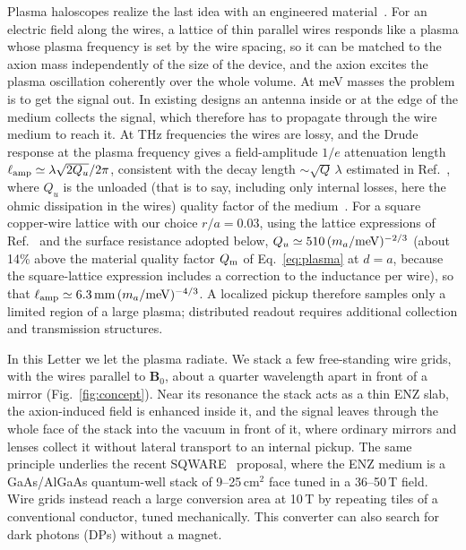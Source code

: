 \documentclass[
  aps,prl,reprint,superscriptaddress,
  amsmath,amssymb,floatfix,nofootinbib
]{revtex4-2}
\newcommand{\Qm}{Q_{\rm m}}
\begin{document}
Plasma haloscopes realize the last idea with an engineered material~\cite{Lawson:2019brd,ALPHA:2022rxj}. For an electric field along the wires, a lattice of thin parallel wires responds like a plasma whose plasma frequency is set by the wire spacing, so it can be matched to the axion mass independently of the size of the device, and the axion excites the plasma oscillation coherently over the whole volume. At meV masses the problem is to get the signal out. In existing designs an antenna inside or at the edge of the medium collects the signal, which therefore has to propagate through the wire medium to reach it. At THz frequencies the wires are lossy, and the Drude response at the plasma frequency gives a field-amplitude $1/e$ attenuation length $\ell_{\rm amp}\simeq\lambda\sqrt{2Q_u}/2\pi$, consistent with the decay length $\sim\sqrt{Q}\,\lambda$ estimated in Ref.~\cite{ALPHA:2022rxj}, where $Q_u$ is the unloaded (that is to say, including only internal losses, here the ohmic dissipation in the wires) quality factor of the medium~\cite{ALPHA:2022rxj}. For a square copper-wire lattice with our choice $r/a=0.03$, using the lattice expressions of Ref.~\cite{ALPHA:2022rxj} and the surface resistance adopted below, $Q_u\simeq510\,(m_a/{\rm meV})^{-2/3}$ (about 14\% above the material quality factor $\Qm$ of Eq.~\eqref{eq:plasma} at $d=a$, because the square-lattice expression includes a correction to the inductance per wire), so that $\ell_{\rm amp}\simeq6.3\,{\rm mm}\,(m_a/{\rm meV})^{-4/3}$. A localized pickup therefore samples only a limited region of a large plasma; distributed readout requires additional collection and transmission structures.

In this Letter we let the plasma radiate. We stack a few free-standing wire grids, with the wires parallel to $\mathbf B_0$, about a quarter wavelength apart in front of a mirror (Fig.~\ref{fig:concept}). Near its resonance the stack acts as a thin ENZ slab, the axion-induced field is enhanced inside it, and the signal leaves through the whole face of the stack into the vacuum in front of it, where ordinary mirrors and lenses collect it without lateral transport to an internal pickup. The same  principle underlies the recent SQWARE~\cite{Mehrani:2025ryc} proposal, where the ENZ medium is a GaAs/AlGaAs quantum-well stack of 9--25\,cm$^2$ face tuned in a 36--50\,T field. Wire grids instead reach a large conversion area at 10\,T by repeating tiles of a conventional conductor, tuned mechanically. This converter can also search for dark photons (DPs) without a magnet. 
\end{document}

